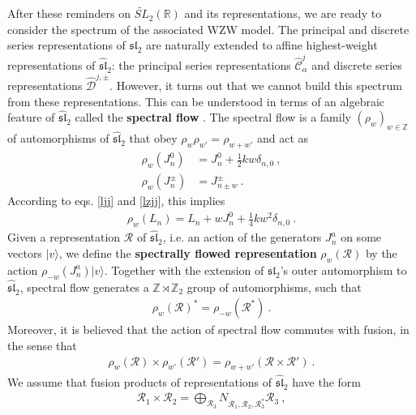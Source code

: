 \documentclass[12pt, a4paper, notitlepage, twoside]{report}
\numberwithin{equation}{section}
\theoremstyle{break}
\begin{document}
After these reminders on $\widetilde{SL}_2(\mathbb{R})$ and its representations, we are ready to consider the spectrum of the associated WZW model.
The principal and discrete series representations of $\mathfrak{sl}_2$ are naturally extended to affine highest-weight representations of $\widehat{\mathfrak{sl}}_2$: the principal series representations $\hat{\mathcal{C}}^j_\alpha$ and discrete series representations $\hat{\mathcal{D}}^{j,\pm}$.
However, it turns out that we cannot build this spectrum from these representations.
This can be understood in terms of an algebraic feature of $\widehat{\mathfrak{sl}}_2$ called the \textbf{\boldmath spectral flow} \cite{mo00a}.
The spectral flow is a family $(\rho_w)_{w\in{\mathbb{Z}}}$ of automorphisms of $\widehat{\mathfrak{sl}}_2$ that obey $\rho_w\rho_{w'}=\rho_{w+w'}$ and act as 
\begin{align}
 \rho_w(J^0_n)&=  J^0_n + \frac12 kw \delta_{n,0}   \ ,
\\
 \rho_w(J^\pm_n) &= J^\pm_{n\pm w}  \ .
\end{align}
According to eqs. \eqref{ljj} and \eqref{lzjj}, this implies
\begin{align}
 \rho_w(L_n)  = L_n + wJ^0_n +\frac14 kw^2 \delta_{n,0}\ .
\end{align}
Given a representation $\mathcal{R}$ of $\widehat{\mathfrak{sl}}_2$, i.e. an action of the generators $J^a_n$ on some vectors $|v\rangle$, we define the \textbf{\boldmath spectrally flowed representation} $\rho_w(\mathcal{R})$ by the action $\rho_{-w}(J^a_n)|v\rangle$.  
Together with the extension of $\mathfrak{sl}_2$'s outer automorphism to $\widehat{\mathfrak{sl}}_2$, spectral flow generates a $\mathbb{Z}\rtimes \mathbb{Z}_2$ group of automorphisms, such that
\begin{align}
 \rho_w(\mathcal{R})^* = \rho_{-w}(\mathcal{R}^*)\ .
\end{align}
Moreover, it is believed that the action of spectral flow commutes with fusion, in the sense that \cite{gab01b}
\begin{align}
 \rho_{w}(\mathcal{R})\times \rho_{w'}(\mathcal{R}') = \rho_{w+w'}(\mathcal{R}\times \mathcal{R}')\ .
\label{rwr}
\end{align}
We assume that fusion products of representations of $\widehat{\mathfrak{sl}}_2$ have the form 
\begin{align}
 \mathcal{R}_1\times \mathcal{R}_2 = \bigoplus_{\mathcal{R}_3} N_{\mathcal{R}_1,\mathcal{R}_2,\mathcal{R}_3^*} \mathcal{R}_3\ ,
\end{align}
\end{document}
